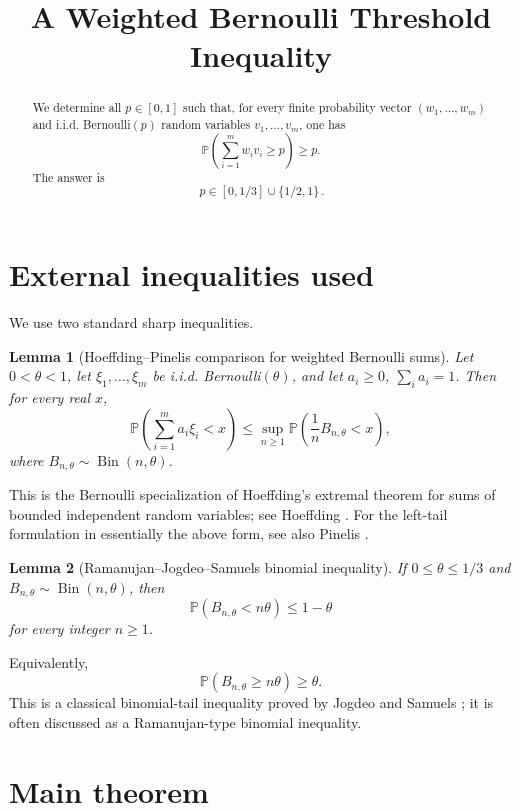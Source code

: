 \documentclass[11pt]{article}
\newtheorem{lemma}{Lemma}
\DeclareMathOperator{\Bin}{Bin}
\begin{document}
\title{A Weighted Bernoulli Threshold Inequality}
\author{}
\date{}
\maketitle

\begin{abstract}
We determine all \(p\in[0,1]\) such that, for every finite probability vector
\((w_1,\ldots,w_m)\) and i.i.d. Bernoulli\((p)\) random variables
\(v_1,\ldots,v_m\), one has
\[
\mathbb P\!\left(\sum_{i=1}^m w_i v_i\ge p\right)\ge p.
\]
The answer is
\[
\boxed{\,p\in[0,1/3]\cup\{1/2,1\}\, }.
\]
\end{abstract}

\section*{External inequalities used}

We use two standard sharp inequalities.

\begin{lemma}[Hoeffding--Pinelis comparison for weighted Bernoulli sums]
\label{lem:hoeffding}
Let \(0<\theta<1\), let \(\xi_1,\ldots,\xi_m\) be i.i.d. Bernoulli\((\theta)\), and let
\(a_i\ge0\), \(\sum_i a_i=1\). Then for every real \(x\),
\[
\mathbb P\!\left(\sum_{i=1}^m a_i\xi_i<x\right)
\le
\sup_{n\ge1}
\mathbb P\!\left(\frac1n B_{n,\theta}<x\right),
\]
where \(B_{n,\theta}\sim \Bin(n,\theta)\).
\end{lemma}

This is the Bernoulli specialization of Hoeffding's extremal theorem for sums of
bounded independent random variables; see Hoeffding \cite[Theorem 4]{Hoeffding1956}.
For the left-tail formulation in essentially the above form, see also Pinelis
\cite[Corollary 3.7]{Pinelis2016}.

\begin{lemma}[Ramanujan--Jogdeo--Samuels binomial inequality]
\label{lem:binomial}
If \(0\le \theta\le 1/3\) and \(B_{n,\theta}\sim \Bin(n,\theta)\), then
\[
\mathbb P(B_{n,\theta}<n\theta)\le 1-\theta
\]
for every integer \(n\ge1\).
\end{lemma}

Equivalently,
\[
\mathbb P(B_{n,\theta}\ge n\theta)\ge \theta .
\]
This is a classical binomial-tail inequality proved by Jogdeo and Samuels
\cite{JogdeoSamuels1968}; it is often discussed as a Ramanujan-type binomial
inequality.

\section*{Main theorem}
\end{document}
